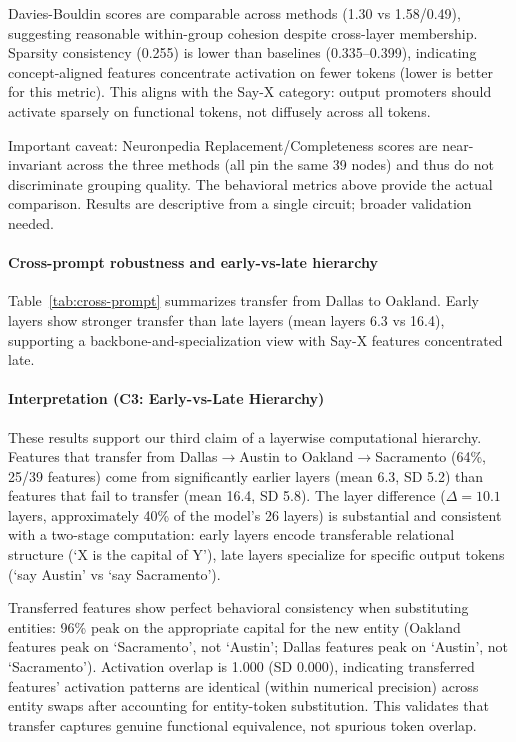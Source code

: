 Davies-Bouldin scores are comparable across methods (1.30 vs 1.58/0.49), suggesting reasonable within-group cohesion despite cross-layer membership. Sparsity consistency (0.255) is lower than baselines (0.335--0.399), indicating concept-aligned features concentrate activation on fewer tokens (lower is better for this metric). This aligns with the Say-X category: output promoters should activate sparsely on functional tokens, not diffusely across all tokens.

Important caveat: Neuronpedia Replacement/Completeness scores are near-invariant across the three methods (all pin the same 39 nodes) and thus do not discriminate grouping quality. The behavioral metrics above provide the actual comparison. Results are descriptive from a single circuit; broader validation needed.

\paragraph{Cross-prompt robustness and early-vs-late hierarchy}
Table~\ref{tab:cross-prompt} summarizes transfer from Dallas to Oakland. Early layers show stronger transfer than late layers (mean layers 6.3 vs 16.4), supporting a backbone-and-specialization view with Say-X features concentrated late.


\paragraph{Interpretation (C3: Early-vs-Late Hierarchy)}
These results support our third claim of a layerwise computational hierarchy. Features that transfer from Dallas$\rightarrow$Austin to Oakland$\rightarrow$Sacramento (64\%, 25/39 features) come from significantly earlier layers (mean 6.3, SD 5.2) than features that fail to transfer (mean 16.4, SD 5.8). The layer difference ($\Delta = 10.1$ layers, approximately 40\% of the model's 26 layers) is substantial and consistent with a two-stage computation: early layers encode transferable relational structure (`X is the capital of Y'), late layers specialize for specific output tokens (`say Austin' vs `say Sacramento').

Transferred features show perfect behavioral consistency when substituting entities: 96\% peak on the appropriate capital for the new entity (Oakland features peak on `Sacramento', not `Austin'; Dallas features peak on `Austin', not `Sacramento'). Activation overlap is 1.000 (SD 0.000), indicating transferred features' activation patterns are identical (within numerical precision) across entity swaps after accounting for entity-token substitution. This validates that transfer captures genuine functional equivalence, not spurious token overlap.

